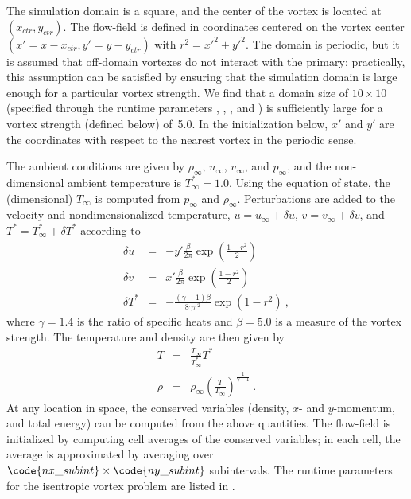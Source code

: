 The simulation domain is a square, and the center of the vortex is
located at $(x_{ctr}, y_{ctr})$. The flow-field is defined in
coordinates centered on the vortex center $(x' = x - x_{ctr}, y' = y
- y_{ctr})$ with $r^2 = {x'}^2 + {y'}^2$. The domain is periodic, but
it is assumed that off-domain vortexes do not interact with the
primary; practically, this assumption can be
satisfied by ensuring that the simulation domain is large enough for a
particular vortex strength. We find that a domain size of $10 \times
10$ (specified through the  runtime parameters ,
, , and ) is sufficiently large for a
vortex strength (defined below) of~5.0. In the initialization below,
$x'$ and $y'$ are the coordinates with respect to the nearest vortex
in the periodic sense.

The ambient conditions are given by $\rho_\infty$, $u_\infty$,
$v_\infty$, and $p_\infty$, and the non-dimensional ambient temperature
is $T^*_\infty = 1.0$. Using the equation of state, the (dimensional)
$T_\infty$ is computed from $p_\infty$ and
$\rho_\infty$. Perturbations are added to the velocity and
nondimensionalized temperature, $u = u_\infty + \delta u$, $v =
v_\infty + \delta v$, and $T^* = T^*_\infty + \delta T^*$ according to
\begin{eqnarray}
\label{Eqn:isentropic_three}
\delta u &=&
-y' {\frac {\beta} {2 \pi}} \exp \left( {\frac {1-r^2} {2}} \right) \\
\delta v &=&
 x' {\frac {\beta} {2 \pi}} \exp \left( {\frac {1-r^2} {2}} \right) \\
\delta T^* &=&
- { \frac {(\gamma - 1 ) \beta}  {8 \gamma \pi^2}} \exp \left( {1-r^2}
\right)~,
\end{eqnarray}
where $\gamma=1.4$ is the ratio of specific heats and $\beta=5.0$ is a
measure of the vortex strength. The temperature and density are then given by
\begin{eqnarray}
T &=& {\frac{T_\infty}{T^*_\infty} } T^* \\
\rho &=& \rho_\infty
  \left( {\frac{T}{T_\infty} } \right)^{\frac{1}{\gamma-1} }~.
\end{eqnarray}
At any location in space, the conserved variables (density, $x$- and
$y$-momentum, and total energy) can be computed from the above
quantities.  The flow-field is initialized by computing cell averages
of the conserved variables; in each cell, the average is
approximated by averaging over $\code{nx\_subint} \times
\code{ny\_subint}$ subintervals. The runtime parameters for the
isentropic vortex problem are listed in .

